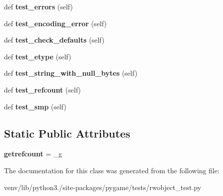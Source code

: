 \begin{DoxyCompactItemize}
\mbox{\label{classpygame_1_1tests_1_1rwobject__test_1_1_r_wops_encode_string_test_a3a4890c5bf63ddfc52a9bf3fd6ab9690}} 
def {\bfseries test\+\_\+errors} (self)
\item 
\mbox{\label{classpygame_1_1tests_1_1rwobject__test_1_1_r_wops_encode_string_test_a102a5195959b57480b75bdfa504f93c1}} 
def {\bfseries test\+\_\+encoding\+\_\+error} (self)
\item 
\mbox{\label{classpygame_1_1tests_1_1rwobject__test_1_1_r_wops_encode_string_test_a4e938ff9a4255a3840ee2070b88580d5}} 
def {\bfseries test\+\_\+check\+\_\+defaults} (self)
\item 
\mbox{\label{classpygame_1_1tests_1_1rwobject__test_1_1_r_wops_encode_string_test_a2102d3e11f15d6aff0614c2360d725b4}} 
def {\bfseries test\+\_\+etype} (self)
\item 
\mbox{\label{classpygame_1_1tests_1_1rwobject__test_1_1_r_wops_encode_string_test_a3c9e54c16068cd8c0530750d2dc87646}} 
def {\bfseries test\+\_\+string\+\_\+with\+\_\+null\+\_\+bytes} (self)
\item 
\mbox{\label{classpygame_1_1tests_1_1rwobject__test_1_1_r_wops_encode_string_test_a0775ae6fa8284823f9557488f48b097a}} 
def {\bfseries test\+\_\+refcount} (self)
\item 
\mbox{\label{classpygame_1_1tests_1_1rwobject__test_1_1_r_wops_encode_string_test_ab6dd88919e7119c128ed417c9809533c}} 
def {\bfseries test\+\_\+smp} (self)
\end{DoxyCompactItemize}
\subsection*{Static Public Attributes}
\begin{DoxyCompactItemize}
\item 
\mbox{\label{classpygame_1_1tests_1_1rwobject__test_1_1_r_wops_encode_string_test_ace58ec7a38d1f2105ea77b567514dcd4}} 
{\bfseries getrefcount} = \+\_\+g
\end{DoxyCompactItemize}


The documentation for this class was generated from the following file\+:\begin{DoxyCompactItemize}
\item 
venv/lib/python3./site-\/packages/pygame/tests/rwobject\+\_\+test.\+py\end{DoxyCompactItemize}
